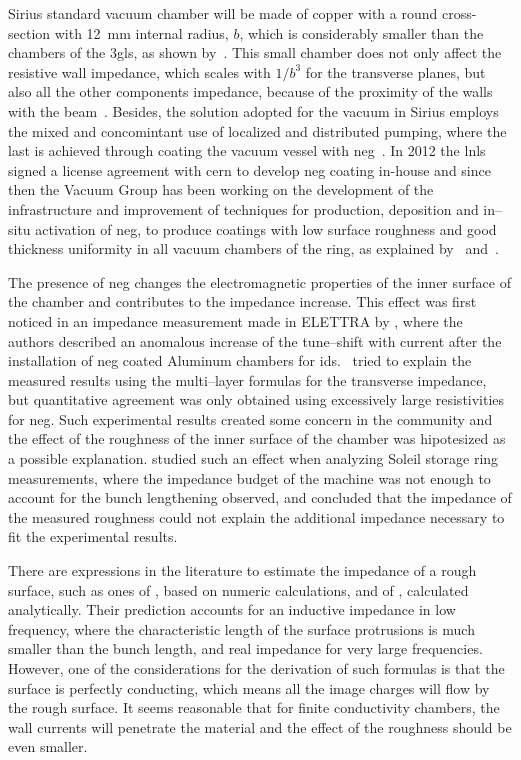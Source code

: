     Sirius standard vacuum chamber will be made of copper with a round cross-section with \SI{12}{\milli\meter} internal radius, $b$, which is considerably smaller than the chambers of the \gls{3gls}, as shown by~.
    This small chamber does not only affect the resistive wall impedance, which scales with $1/b^3$ for the transverse planes, but also all the other components impedance, because of the proximity of the walls with the beam~\cite{Nagaoka2014}. Besides, the solution adopted for the vacuum in Sirius employs the mixed and concomintant use of localized and distributed pumping, where the last is achieved through coating the vacuum vessel with \gls{neg}~\cite{Benvenuti1998,Prodromides2002}. In 2012 the \gls{lnls} signed a license agreement with \gls{cern} to develop \gls{neg} coating in-house and since then the Vacuum Group has been working on the development of the infrastructure and improvement of techniques for production, deposition and in--situ activation of \gls{neg}, to produce coatings with low surface roughness and good thickness uniformity in all vacuum chambers of the ring, as explained by~ and~.

    The presence of \gls{neg} changes the electromagnetic properties of the inner surface of the chamber and contributes to the impedance increase. This effect was first noticed in an impedance measurement made in ELETTRA by , where the authors described an anomalous increase of the tune--shift with current after the installation of \gls{neg} coated Aluminum chambers for \glspl{id}.~ tried to explain the measured results using the multi--layer formulas for the transverse impedance, but quantitative agreement was only obtained using excessively large resistivities for \gls{neg}. Such experimental results created some concern in the community and the effect of the roughness of the inner surface of the chamber was hipotesized as a possible explanation.  studied such an effect when analyzing Soleil storage ring measurements, where the impedance budget of the machine was not enough to account for the bunch lengthening observed, and concluded that the impedance of the measured roughness could not explain the additional impedance necessary to fit the experimental results.

    There are expressions in the literature to estimate the impedance of a rough surface, such as ones of , based on numeric calculations, and of , calculated analytically. Their prediction accounts for an inductive impedance in low frequency, where the characteristic length of the surface protrusions is much smaller than the bunch length, and real impedance for very large frequencies. However, one of the considerations for the derivation of such formulas is that the surface is perfectly conducting, which means all the image charges will flow by the rough surface. It seems reasonable that for finite conductivity chambers, the wall currents will penetrate the material and the effect of the roughness should be even smaller.

